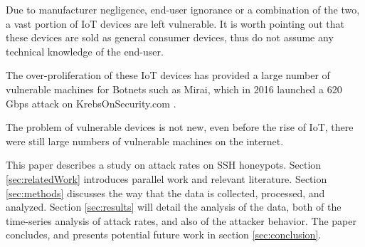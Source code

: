     Due to manufacturer negligence, end-user ignorance or 
    a combination of the two, a vast portion of IoT devices
    are left vulnerable. It is worth pointing out that these
    devices are sold as general consumer devices, thus do
    not assume any technical knowledge of the end-user.


    The over-proliferation of these IoT devices has 
    provided a large number of vulnerable machines 
    for Botnets such as Mirai, which in 2016
    launched a 620 Gbps attack on KrebsOnSecurity.com
    \cite{Brian_Krebs_2016}.


    The problem of vulnerable devices is not new, 
    even before the rise of IoT, 
    there were still large numbers of vulnerable machines 
    on the internet.


    
    This paper describes a study on attack rates on SSH 
    honeypots.
    Section \ref{sec:relatedWork} introduces parallel work 
        and relevant literature.
    Section \ref{sec:methods} discusses the way that the 
        data is collected, processed, and analyzed.
    Section \ref{sec:results} will detail the analysis of
        the data, both of the time-series analysis of 
        attack rates, and also of the attacker behavior.
    The paper concludes, and presents potential future
    work in section \ref{sec:conclusion}. 